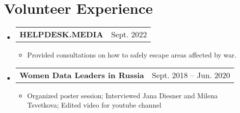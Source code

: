 \documentclass[letterpaper,11pt]{article}
\makeatletter
\newcommand{\myuline}[1]{%
  \uline{\phantom{#1}}%
  \llap{\contour{white}{#1}}%
}
\newcommand{\MYhref}[2]{
\myuline{\href{#1}{{#2}}}
}%
\newcommand{\resumeItem}[1]{
  \item\small{
    {#1 \vspace{-1pt}}
  }
}
\newcommand{\resumeProjectHeading}[2]{
    \item
    \begin{tabular*}{\textwidth}[t]{l@{\extracolsep{\fill}}r}
    \textbf{#1} & {\color{dark-grey}\small #2}\vspace{1pt}\\ %
    \end{tabular*}\vspace{-4pt}
}
\newcommand{\resumeSubHeadingListStart}{\begin{itemize}[leftmargin=0in, label={}]}
\newcommand{\resumeSubHeadingListEnd}{\end{itemize}}
\newcommand{\resumeItemListStart}{\begin{itemize}[label={-}]}
\newcommand{\resumeItemListEnd}{\end{itemize}\vspace{0pt}}
\makeatother
\begin{document}
\nocite{CODE2023}
\nocite{IC2S22023}
\nocite{HCID2022}
\nocite{Sunbelt2020}
\nocite{ICCSS2019}


\printbibliography[filter=presentations,title={Conference presentations}]



          
          
          


\section{Volunteer Experience}
    \resumeSubHeadingListStart
      \resumeProjectHeading
        {HELPDESK.MEDIA} {Sept. 2022} 
          \resumeItemListStart
            \resumeItem{Provided consultations on how to safely escape areas affected by war.}
          \resumeItemListEnd
        \resumeProjectHeading
        {Women Data Leaders in Russia} {Sept. 2018 -- Jun. 2020}
          \resumeItemListStart
            \resumeItem{Organized poster session; Interviewed Jana Diesner and Milena Tsvetkova; Edited video for youtube channel}
          \resumeItemListEnd
    \resumeSubHeadingListEnd
\end{document}
